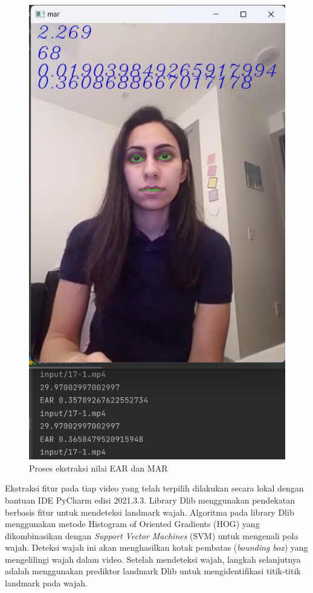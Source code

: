 \begin{figure} [ht] \centering
      \includegraphics[scale=0.65]{gambar/ekstraksi.png}
      \caption{Proses ekstraksi nilai EAR dan MAR}
      \label{fig:ekstraksi}
\end{figure}

Ekstraksi fitur pada tiap video yang telah terpilih dilakukan secara lokal dengan bantuan IDE PyCharm edisi 2021.3.3.
Library Dlib menggunakan pendekatan berbasis fitur untuk mendeteksi landmark wajah. Algoritma pada library Dlib menggunakan
metode Histogram of Oriented Gradients (HOG) yang dikombinasikan dengan \emph{Support Vector Machines} (SVM) untuk mengenali pola wajah.
Deteksi wajah ini akan menghasilkan kotak pembatas (\emph{bounding box}) yang mengelilingi wajah dalam video. Setelah mendeteksi wajah,
langkah selanjutnya adalah menggunakan prediktor landmark Dlib untuk mengidentifikasi titik-titik landmark pada wajah.

